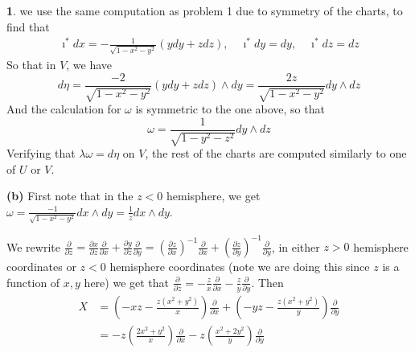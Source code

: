 \documentclass[10.5pt]{article}
\theoremstyle{definition}
\newtheorem{pb}{}
\newcommand{\parx}{\frac{\partial}{\partial x}}
\newcommand{\pary}{\frac{\partial}{\partial y}}
\newcommand{\parz}{\frac{\partial}{\partial z}}
\newcommand{\z}{\imath}
\begin{document}
\begin{pb}
        we use the same computation as problem 1 due to symmetry of the charts, to find that
        \begin{align*}
            \z^*dx = - \frac{1}{\sqrt{1-x^2-y^2}}(ydy+zdz), \quad \z^*dy = dy, \quad 
            \z^*dz = dz
        \end{align*}
        So that in \(V\), we have 
        \[d \eta = \frac{-2}{\sqrt{1-x^2-y^2}}(ydy + zdz) \wedge dy = \frac{2z}{\sqrt{1-x^2-y^2}}dy\wedge dz\]
        And the calculation for \(\omega\) is symmetric to the one above, so that
        \[\omega = \frac{1}{\sqrt{1-y^2-z^2}}dy\wedge dz\]
        Verifying that \(\lambda \omega = d\eta\) on \(V\), the rest of the charts are computed similarly to one of \(U\) or \(V\).

        \textbf{(b)} First note that in the \(z < 0\) hemisphere, we get
        \(\omega = \frac{-1}{\sqrt{1-x^2-y^2}} dx \wedge dy = \frac{1}{z}dx\wedge dy\).

        We rewrite \(\parz = \frac{\partial x}{\partial z}\parx + \frac{\partial y}{\partial z}\pary = (\frac{\partial z}{\partial x})^{-1}\parx + (\frac{\partial z}{\partial y})^{-1}\pary\), in either \(z > 0\) hemisphere coordinates or \(z < 0\) hemisphere coordinates (note we are doing this since \(z\) is a function of \(x,y\) here) we get that \(\parz = - \frac{z}{x}\parx - \frac{z}{y}\pary\).
        Then
        \begin{align*}
            X &= \left(-xz - \frac{z(x^2 + y^2)}{x} \right)\parx  
            + \left(-yz - \frac{z(x^2 + y^2)}{y}\right) \pary \\
            &= -z\left(\frac{2x^2 + y^2}{x}\right) \parx - z\left(\frac{x^2 + 2y^2}{y}\right)\pary
        \end{align*}


\end{pb}
\end{document}
